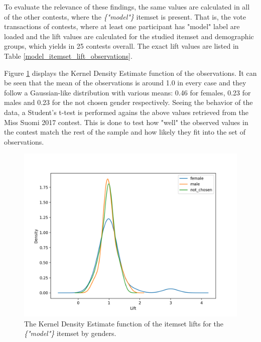 To evaluate the relevance of these findings, the same values are calculated in all of the other contests, where the \emph{\{"model"\}} itemset is present. That is, the vote transactions of contests, where at least one participant has "model" label are loaded and the lift values are calculated for the studied itemset and demographic groups, which yields in 25 contests overall. The exact lift values are listed in Table \ref{model_itemset_lift_observations}. 

Figure \ref{model_itemset_lift_distribution} displays the Kernel Density Estimate function of the observations. It can be seen that the mean of the observations is around 1.0 in every case and they follow a Gaussian-like distribution with various means: 0.46 for females, 0.23 for males and 0.23 for the not chosen gender respectively. Seeing the behavior of the data, a Student's t-test is performed agains the above values retrieved from the Miss Suomi 2017 contest. This is done to test how "well" the observed values in the contest match the rest of the sample and how likely they fit into the set of observations.

\begin{figure}[H] 
    \begin{center}
        \includegraphics[width=1\textwidth,center]{Images/model_itemset_kde.png}
        \caption{The Kernel Density Estimate function of the itemset lifts for the \emph{\{"model"\}} itemset by genders.}
        \label{model_itemset_lift_distribution}
    \end{center}
\end{figure}

